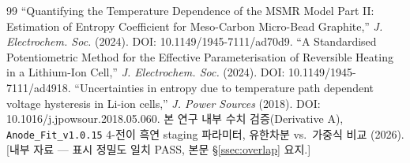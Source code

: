 \documentclass[11pt,a4paper]{article}
\begin{document}
\begin{thebibliography}{99}
 ``Quantifying the Temperature Dependence of the MSMR Model Part II: Estimation of Entropy Coefficient for Meso-Carbon Micro-Bead Graphite,'' \emph{J. Electrochem. Soc.} (2024). DOI: 10.1149/1945-7111/ad70d9.
 ``A Standardised Potentiometric Method for the Effective Parameterisation of Reversible Heating in a Lithium-Ion Cell,'' \emph{J. Electrochem. Soc.} (2024). DOI: 10.1149/1945-7111/ad4918.
 ``Uncertainties in entropy due to temperature path dependent voltage hysteresis in Li-ion cells,'' \emph{J. Power Sources} (2018). DOI: 10.1016/j.jpowsour.2018.05.060.
 본 연구 내부 수치 검증(Derivative A), \texttt{Anode\_Fit\_v1.0.15} 4-전이 흑연 staging 파라미터, 유한차분 vs.\ 가중식 비교 (2026). [내부 자료 — 표시 정밀도 일치 PASS, 본문 \S\ref{ssec:overlap} 요지.]
\end{thebibliography}
\end{document}

